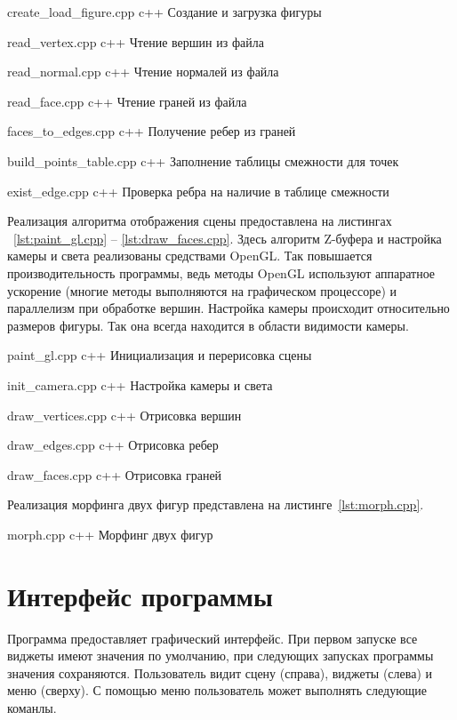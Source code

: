 {create_load_figure.cpp}
{c++}
{Создание и загрузка фигуры}

{read_vertex.cpp}
{c++}
{Чтение вершин из файла}

{read_normal.cpp}
{c++}
{Чтение нормалей из файла}

{read_face.cpp}
{c++}
{Чтение граней из файла}

{faces_to_edges.cpp}
{c++}
{Получение ребер из граней}

{build_points_table.cpp}
{c++}
{Заполнение таблицы смежности для точек}

{exist_edge.cpp}
{c++}
{Проверка ребра на наличие в таблице смежности}


Реализация алгоритма отображения сцены предоставлена на листингах ~\ref{lst:paint_gl.cpp} -- \ref{lst:draw_faces.cpp}. 
Здесь алгоритм Z-буфера и настройка камеры и света реализованы средствами OpenGL.
Так повышается производительность программы, ведь методы OpenGL используют аппаратное ускорение (многие методы выполняются на графическом процессоре) и параллелизм при обработке вершин. 
Настройка камеры происходит относительно размеров фигуры. 
Так она всегда находится в области видимости камеры.

{paint_gl.cpp}
{c++}
{Инициализация и перерисовка сцены}

{init_camera.cpp}
{c++}
{Настройка камеры и света}

{draw_vertices.cpp}
{c++}
{Отрисовка вершин}

{draw_edges.cpp}
{c++}
{Отрисовка ребер}

{draw_faces.cpp}
{c++}
{Отрисовка граней}

\newpage

Реализация морфинга двух фигур представлена на листинге~\ref{lst:morph.cpp}.

{morph.cpp}
{c++}
{Морфинг двух фигур}


\section{Интерфейс программы}

Программа предоставляет графический интерфейс. 
При первом запуске все виджеты имеют значения по умолчанию, при следующих запусках программы значения сохраняются.
Пользователь видит сцену (справа), виджеты (слева) и меню (сверху).
С помощью меню пользователь может выполнять следующие команлы.

